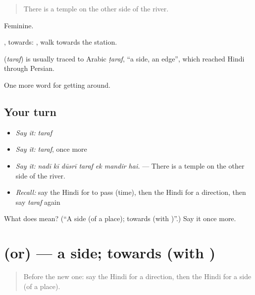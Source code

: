 \begin{quote}
There is a temple on the other side of the river.
\end{quote}

Feminine.

 , towards:    , walk towards the station.

\begin{cousinweb}
\textbf{} (\emph{taraf}) is usually traced to Arabic \emph{ṭaraf}, \textquotedblleft{}a side, an edge\textquotedblright{}, which reached Hindi through Persian.
\end{cousinweb}

\begin{grammarlens}[title={What you've built}]
One more word for getting around.
\end{grammarlens}

\subsection*{Your turn}
\begin{itemize}
\raggedright
  \item \emph{Say it:} \emph{taraf}
  \item \emph{Say it:} \emph{taraf}, once more
  \item \emph{Say it:} \emph{nadī kī dūsrī taraf ek mandir hai.} — There is a temple on the other side of the river.
  \item \emph{Recall:} say the Hindi for to pass (time), then the Hindi for a direction, then say \emph{taraf} again
\end{itemize}

\begin{tcolorbox}[breakable,colback=teal!4,colframe=teal!35!black,title={Before you move on}]
What does  mean? (\textquotedblleft{}A side (of a place); towards (with )\textquotedblright{}.) Say it once more.
\end{tcolorbox}
\section[\texorpdfstring{\hi{ओर} (or)}{ओर (or)}]{ (or) — a side; towards (with )}

\label{lesson:HI-C417-or}



\begin{quote}
Before the new one: say the Hindi for a direction, then the Hindi for a side (of a place).
\end{quote}

